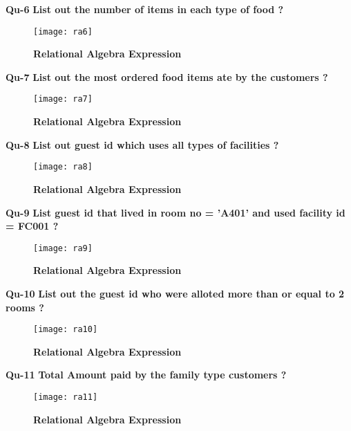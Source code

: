 \documentclass[a4,12pt]{report}
\begin{document}
\textbf{Qu-6} \textbf{ List out the number of items in each type of food ? }\\

\begin{figure}[hbtp]
\centering
\texttt{[image: ra6]}
\caption{\textbf{{\color{red}Relational Algebra Expression}}}
\end{figure}

\newpage
\textbf{Qu-7} \textbf{ List out the most ordered food items ate by the customers ? }\\

\begin{figure}[hbtp]
\centering
\texttt{[image: ra7]}
\caption{\textbf{{\color{red}Relational Algebra Expression}}}
\end{figure}

\textbf{Qu-8} \textbf{ List out guest id which uses all types of facilities ? }\\

\begin{figure}[hbtp]
\centering
\texttt{[image: ra8]}
\caption{\textbf{{\color{red}Relational Algebra Expression}}}
\end{figure}

\newpage
\textbf{Qu-9} \textbf{ List guest id that lived in room no = ’A401’ and used facility id = FC001 ? }\\

\begin{figure}[hbtp]
\centering
\texttt{[image: ra9]}
\caption{\textbf{{\color{red}Relational Algebra Expression}}}
\end{figure}

\textbf{Qu-10} \textbf{ List out the guest id who were alloted more than or equal to 2 rooms ?}\\

\begin{figure}[hbtp]
\centering
\texttt{[image: ra10]}
\caption{\textbf{{\color{red}Relational Algebra Expression}}}
\end{figure}

\textbf{Qu-11} \textbf{ Total Amount paid by the family type customers ? }\\

\begin{figure}[hbtp]
\centering
\texttt{[image: ra11]}
\caption{\textbf{{\color{red}Relational Algebra Expression}}}
\end{figure}
\end{document}
